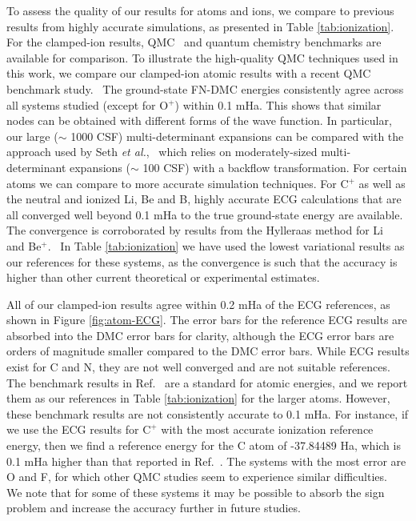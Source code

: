 \documentclass[aip,jcp,numerical,reprint]{revtex4-1}
\begin{document}
To assess the quality of our results for atoms and ions, we compare to previous results from highly accurate simulations, as presented in Table \ref{tab:ionization}. For the clamped-ion results, QMC~\cite{Brown_Bench,Toulouse_Bench,Seth_Bench,Morale_Bench,Rappe_Bench} and quantum chemistry benchmarks are available for comparison. To illustrate the high-quality QMC techniques used in this work, we compare our clamped-ion atomic results with a recent QMC benchmark study.~\cite{Seth_Bench} The ground-state FN-DMC energies consistently agree across all systems studied (except for O$^{+}$) within 0.1 mHa. This shows that similar nodes can be obtained with different forms of the wave function. In particular, our large ($\sim$ 1000 CSF) multi-determinant expansions can be compared with the approach used by Seth {\it et al.},~\cite{Seth_Bench} which relies on moderately-sized multi-determinant expansions ($\sim$ 100 CSF) with a backflow transformation. For certain atoms we can compare to more accurate simulation techniques. For C$^+$ as well as the neutral and ionized Li, Be and B, highly accurate ECG calculations that are all converged well beyond 0.1 mHa to the true ground-state energy are available. The convergence is corroborated by results from the Hylleraas method for Li~\cite{Wang_Li} and Be$^+$.~\cite{Puchalski_Be+} In Table \ref{tab:ionization} we have used the lowest variational results as our references for these systems, as the convergence is such that the accuracy is higher than other current theoretical or experimental estimates. 

All of our clamped-ion results agree within 0.2 mHa of the ECG references, as shown in Figure \ref{fig:atom-ECG}. The error bars for the reference ECG results are absorbed into the DMC error bars for clarity, although the ECG error bars are orders of magnitude smaller compared to the DMC error bars. While ECG results exist for C and N, they are not well converged and are not suitable references.~\cite{Bubin_C,Sharkey_N} The benchmark results in Ref.~\cite{Davidson_Atoms} are a standard for atomic energies, and we report them as our references in Table \ref{tab:ionization} for the larger atoms. However, these benchmark results are not consistently accurate to 0.1 mHa. For instance, if we use the ECG results for $\text{C}^+$ with the most accurate ionization reference energy, then we find a reference energy for the C atom of -37.84489 Ha, which is 0.1 mHa higher than that reported in Ref.~\cite{Davidson_Atoms}. %
The systems with the most error are O and F, for which other QMC studies seem to experience similar difficulties.~\cite{Seth_Bench,Booth_FCIQMC,Brown_Bench,Shiwei_AFQMC} We note that for some of these systems it may be possible to absorb the sign problem and increase the accuracy further in future studies.~\cite{Tubman_Release,Tubman_ACS} %
\end{document}
